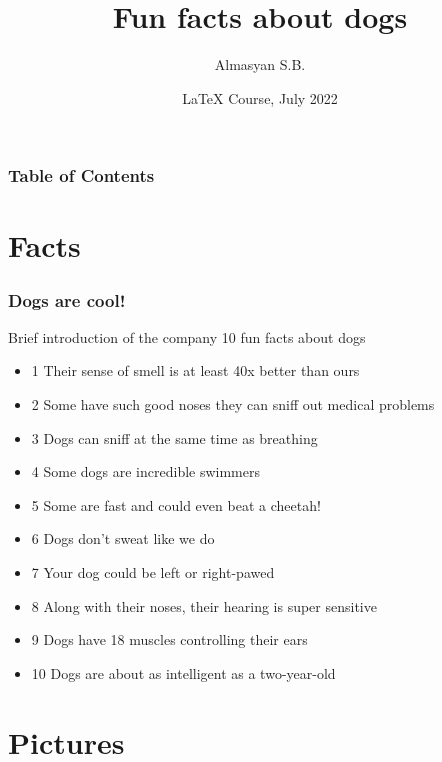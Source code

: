 \documentclass{beamer}
\title[Introduction to LaTeX] 
{Fun facts about dogs}
\author[Almasyan] 
{Almasyan S.B.}
\institute[HSE] 
{
  Faculty of Computer Science \\
  HSE University
}
\date[July 2022] 
{LaTeX Course, July 2022}
\begin{document}
\frame{\titlepage}

\begin{frame}
\frametitle{Table of Contents}
\tableofcontents
\end{frame}


\section{Facts}

\begin{frame}
\frametitle{Dogs are cool!}
\begin{block}{Brief introduction of the company}
10 fun facts about dogs
\begin{itemize}
    \item 1 Their sense of smell is at least 40x better than ours
    \item 2 Some have such good noses they can sniff out medical problems
    \item 3 Dogs can sniff at the same time as breathing
    \item 4 Some dogs are incredible swimmers
    \item 5 Some are fast and could even beat a cheetah!
    \item 6 Dogs don’t sweat like we do
    \item 7 Your dog could be left or right-pawed
    \item 8 Along with their noses, their hearing is super sensitive
    \item 9 Dogs have 18 muscles controlling their ears
    \item 10 Dogs are about as intelligent as a two-year-old
\end{itemize}
\end{block}
\end{frame}

\section{Pictures}
\end{document}
